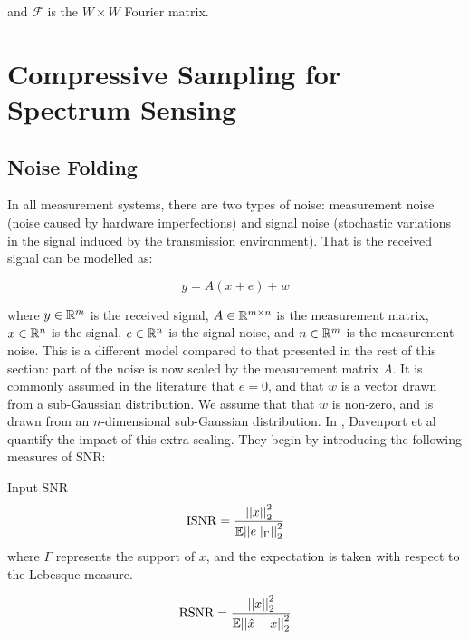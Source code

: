 and \(\mathcal{F}\) is the \(W \times W\) Fourier matrix. 

\section{Compressive Sampling for Spectrum Sensing}

\subsection{Noise Folding}
In all measurement systems, there are two types of noise: measurement noise (noise caused by hardware imperfections) and signal noise (stochastic variations in the signal induced by the transmission environment). That is the received signal can be modelled as:

\begin{equation}
y = A(x+e) + w 
\end{equation}

where \(y \in {\mathbb{R}}^m\) is the received signal, \(A \in {\mathbb{R}}^{m \times n}\) is the measurement matrix, \(x \in {\mathbb{R}}^n\) is the signal, \(e \in {\mathbb{R}}^n\) is the signal noise, and \(n \in {\mathbb{R}}^m\) is the measurement noise. This is a different model compared to that presented in the rest of this section: part of the noise is now scaled by the measurement matrix \(A\). It is commonly assumed in the literature that \(e = 0\), and that \(w\) is a vector drawn from a sub-Gaussian distribution. We assume that that \(w\) is non-zero, and is drawn from an \(n\)-dimensional sub-Gaussian distribution. In \cite{davenport2012pros}, Davenport et al quantify the impact of this extra scaling. They begin by introducing the following measures of SNR:

\begin{definition}{Input SNR}
\begin{equation}
\mathrm{ISNR} = \frac{\left|\left|x\right|\right|_2^2}{{\mathbb{E}}{\left|\left|e\mid_\Gamma\right|\right|}_2^2}
\end{equation}
where \(\Gamma\) represents the support of \(x\), and the expectation is taken with respect to the Lebesque measure.
\end{definition}

\begin{definition}
\begin{equation}
\mathrm{RSNR} = \frac{\left|\left|x\right|\right|_2^2}{{\mathbb{E}}{\left|\left|\hat{x}-x\right|\right|}_2^2}
\end{equation}
\end{definition}


